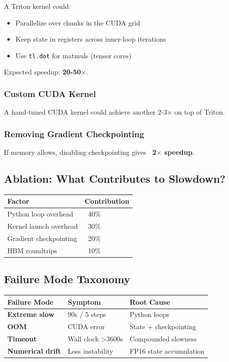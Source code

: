 A Triton kernel could:
\begin{itemize}
\item Parallelize over chunks in the CUDA grid
\item Keep state in registers across inner-loop iterations
\item Use \texttt{tl.dot} for matmuls (tensor cores)

\end{itemize}
Expected speedup: \textbf{20-50$\times$}.

\subsubsection{Custom CUDA Kernel}

A hand-tuned CUDA kernel could achieve another 2-3$\times$ on top of Triton.

\subsubsection{Removing Gradient Checkpointing}

If memory allows, disabling checkpointing gives \textbf{~2$\times$ speedup}.

\subsection{Ablation: What Contributes to Slowdown?}

\begin{table}[H]
\centering
\small
\begin{tabular}{ll}
\toprule
\textbf{Factor} & \textbf{Contribution} \\
\midrule
Python loop overhead & ~40\% \\
Kernel launch overhead & ~30\% \\
Gradient checkpointing & ~20\% \\
HBM roundtrips & ~10\% \\
\bottomrule
\end{tabular}
\end{table}

\subsection{Failure Mode Taxonomy}

\begin{table}[H]
\centering
\small
\begin{tabular}{lll}
\toprule
\textbf{Failure Mode} & \textbf{Symptom} & \textbf{Root Cause} \\
\midrule
\textbf{Extreme slow} & 90s / 5 steps & Python loops \\
\textbf{OOM} & CUDA error & State + checkpointing \\
\textbf{Timeout} & Wall clock >3600s & Compounded slowness \\
\textbf{Numerical drift} & Loss instability & FP16 state accumulation \\
\bottomrule
\end{tabular}
\end{table}


